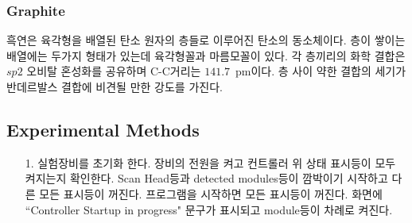 \documentclass[aps,reprint,superscriptaddress,11pt]{revtex4-2}
\begin{document}
\subsubsection{Graphite}
흑연은 육각형을 배열된 탄소 원자의 층들로 이루어진 탄소의 동소체이다. 층이 쌓이는 배열에는
두가지 형태가 있는데 육각형꼴과 마름모꼴이 있다. 각 층끼리의 화학 결합은 $sp2$ 오비탈 혼성화를
공유하며 C-C거리는 $141.7$~pm이다. 층 사이 약한 결합의 세기가 반데르발스 결합에 비견될 만한
강도를 가진다.
\subsection{Experimental Methods}
\begin{itemize}
  \item[1. ] 실험장비를 초기화 한다. 장비의 전원을 켜고 컨트롤러 위 상태 표시등이 모두 켜지는지
  확인한다. Scan Head등과 detected modules등이 깜박이기 시작하고 다른 모든 표시등이 꺼진다.
  프로그램을 시작하면 모든 표시등이 꺼진다. 화면에 “Controller Startup in 
  progress" 문구가 표시되고 module등이 차례로 켜진다. 
  

\end{itemize}
\end{document}
